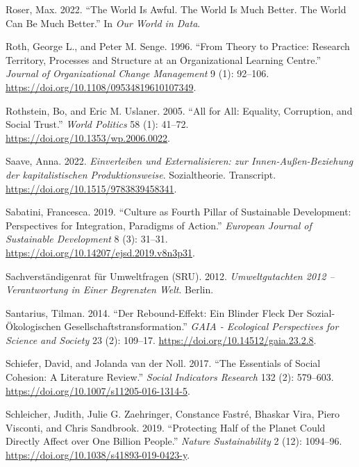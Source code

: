 \documentclass[
  a4paper,
  DIV=11,
  numbers=noendperiod,
  oneside,
  openany]{scrreprt}
\newlength{\cslhangindent}
\newenvironment{CSLReferences}[2] %
 {\begin{list}{}{%
  \setlength{\itemindent}{0pt}
  \setlength{\leftmargin}{0pt}
  \setlength{\parsep}{0pt}
  \ifodd #1
   \setlength{\leftmargin}{\cslhangindent}
   \setlength{\itemindent}{-1\cslhangindent}
  \fi
  \setlength{\itemsep}{#2\baselineskip}}}
 {\end{list}}
\begin{document}
\begin{CSLReferences}{1}{1}
Roser, Max. 2022. {``The World Is Awful. {The} World Is Much Better.
{The} World Can Be Much Better.''} In \emph{Our World in Data}.

Roth, George L., and Peter M. Senge. 1996. {``From Theory to Practice:
Research Territory, Processes and Structure at an Organizational
Learning Centre.''} \emph{Journal of Organizational Change Management} 9
(1): 92--106. \url{https://doi.org/10.1108/09534819610107349}.

Rothstein, Bo, and Eric M. Uslaner. 2005. {``All for {All}: {Equality},
{Corruption}, and {Social Trust}.''} \emph{World Politics} 58 (1):
41--72. \url{https://doi.org/10.1353/wp.2006.0022}.

Saave, Anna. 2022. \emph{{Einverleiben und Externalisieren: zur
Innen-Au{ß}en-Beziehung der kapitalistischen Produktionsweise}}.
{Sozialtheorie}. Transcript.
\url{https://doi.org/10.1515/9783839458341}.

Sabatini, Francesca. 2019. {``Culture as {Fourth Pillar} of {Sustainable
Development}: {Perspectives} for {Integration}, {Paradigms} of
{Action}.''} \emph{European Journal of Sustainable Development} 8 (3):
31--31. \url{https://doi.org/10.14207/ejsd.2019.v8n3p31}.

Sachverständigenrat für Umweltfragen (SRU). 2012. \emph{Umweltgutachten
2012 -- {Verantwortung} in Einer Begrenzten {Welt}}. Berlin.

Santarius, Tilman. 2014. {``Der {Rebound-Effekt}: Ein Blinder {Fleck}
Der Sozial-{Ö}kologischen {Gesellschaftstransformation}.''} \emph{GAIA -
Ecological Perspectives for Science and Society} 23 (2): 109--17.
\url{https://doi.org/10.14512/gaia.23.2.8}.

{Schiefer, David, and Jolanda van der Noll}. 2017. {``The {Essentials}
of {Social Cohesion}: {A Literature Review}.''} \emph{Social Indicators
Research} 132 (2): 579--603.
\url{https://doi.org/10.1007/s11205-016-1314-5}.

Schleicher, Judith, Julie G. Zaehringer, Constance Fastré, Bhaskar Vira,
Piero Visconti, and Chris Sandbrook. 2019. {``Protecting Half of the
Planet Could Directly Affect over One Billion People.''} \emph{Nature
Sustainability} 2 (12): 1094--96.
\url{https://doi.org/10.1038/s41893-019-0423-y}.


\end{CSLReferences}
\end{document}
